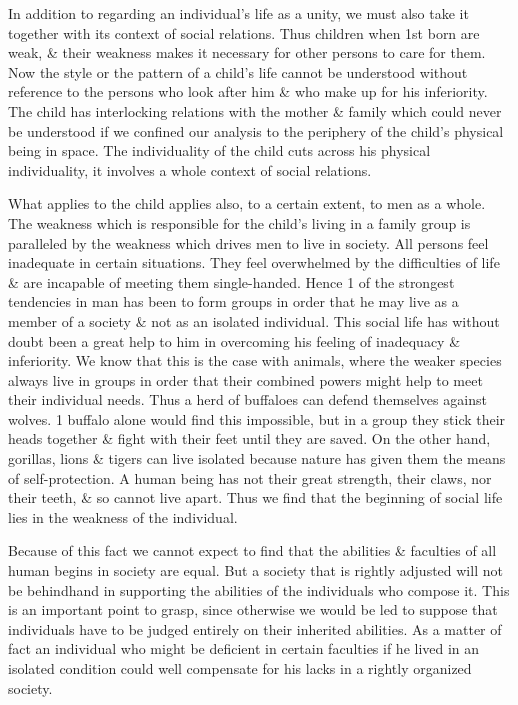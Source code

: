 \documentclass{article}
\numberwithin{equation}{section}
\begin{document}
In addition to regarding an individual's life as a unity, we must also take it together with its context of social relations. Thus children when 1st born are weak, \& their weakness makes it necessary for other persons to care for them. Now the style or the pattern of a child's life cannot be understood without reference to the persons who look after him \& who make up for his inferiority. The child has interlocking relations with the mother \& family which could never be understood if we confined our analysis to the periphery of the child's physical being in space. The individuality of the child cuts across his physical individuality, it involves a whole context of social relations.

What applies to the child applies also, to a certain extent, to men as a whole. The weakness which is responsible for the child's living in a family group is paralleled by the weakness which drives men to live in society. All persons feel inadequate in certain situations. They feel overwhelmed by the difficulties of life \& are incapable of meeting them single-handed. Hence 1 of the strongest tendencies in man has been to form groups in order that he may live as a member of a society \& not as an isolated individual. This social life has without doubt been a great help to him in overcoming his feeling of inadequacy \& inferiority. We know that this is the case with animals, where the weaker species always live in groups in order that their combined powers might help to meet their individual needs. Thus a herd of buffaloes can defend themselves against wolves. 1 buffalo alone would find this impossible, but in a group they stick their heads together \& fight with their feet until they are saved. On the other hand, gorillas, lions \& tigers can live isolated because nature has given them the means of self-protection. A human being has not their great strength, their claws, nor their teeth, \& so cannot live apart. Thus we find that the beginning of social life lies in the weakness of the individual.

Because of this fact we cannot expect to find that the abilities \& faculties of all human begins in society are equal. But a society that is rightly adjusted will not be behindhand in supporting the abilities of the individuals who compose it. This is an important point to grasp, since otherwise we would be led to suppose that individuals have to be judged entirely on their inherited abilities. As a matter of fact an individual who might be deficient in certain faculties if he lived in an isolated condition could well compensate for his lacks in a rightly organized society.
\end{document}
